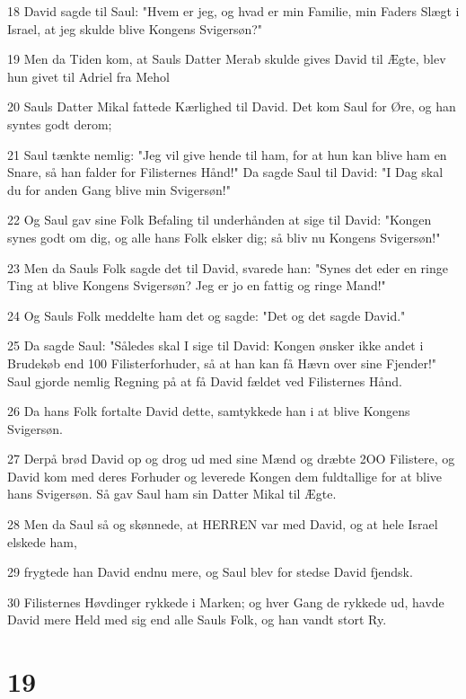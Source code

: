 \par 18 David sagde til Saul: "Hvem er jeg, og hvad er min Familie, min Faders Slægt i Israel, at jeg skulde blive Kongens Svigersøn?"
\par 19 Men da Tiden kom, at Sauls Datter Merab skulde gives David til Ægte, blev hun givet til Adriel fra Mehol
\par 20 Sauls Datter Mikal fattede Kærlighed til David. Det kom Saul for Øre, og han syntes godt derom;
\par 21 Saul tænkte nemlig: "Jeg vil give hende til ham, for at hun kan blive ham en Snare, så han falder for Filisternes Hånd!" Da sagde Saul til David: "I Dag skal du for anden Gang blive min Svigersøn!"
\par 22 Og Saul gav sine Folk Befaling til underhånden at sige til David: "Kongen synes godt om dig, og alle hans Folk elsker dig; så bliv nu Kongens Svigersøn!"
\par 23 Men da Sauls Folk sagde det til David, svarede han: "Synes det eder en ringe Ting at blive Kongens Svigersøn? Jeg er jo en fattig og ringe Mand!"
\par 24 Og Sauls Folk meddelte ham det og sagde: "Det og det sagde David."
\par 25 Da sagde Saul: "Således skal I sige til David: Kongen ønsker ikke andet i Brudekøb end 100 Filisterforhuder, så at han kan få Hævn over sine Fjender!" Saul gjorde nemlig Regning på at få David fældet ved Filisternes Hånd.
\par 26 Da hans Folk fortalte David dette, samtykkede han i at blive Kongens Svigersøn.
\par 27 Derpå brød David op og drog ud med sine Mænd og dræbte 2OO Filistere, og David kom med deres Forhuder og leverede Kongen dem fuldtallige for at blive hans Svigersøn. Så gav Saul ham sin Datter Mikal til Ægte.
\par 28 Men da Saul så og skønnede, at HERREN var med David, og at hele Israel elskede ham,
\par 29 frygtede han David endnu mere, og Saul blev for stedse David fjendsk.
\par 30 Filisternes Høvdinger rykkede i Marken; og hver Gang de rykkede ud, havde David mere Held med sig end alle Sauls Folk, og han vandt stort Ry.

\chapter{19}

